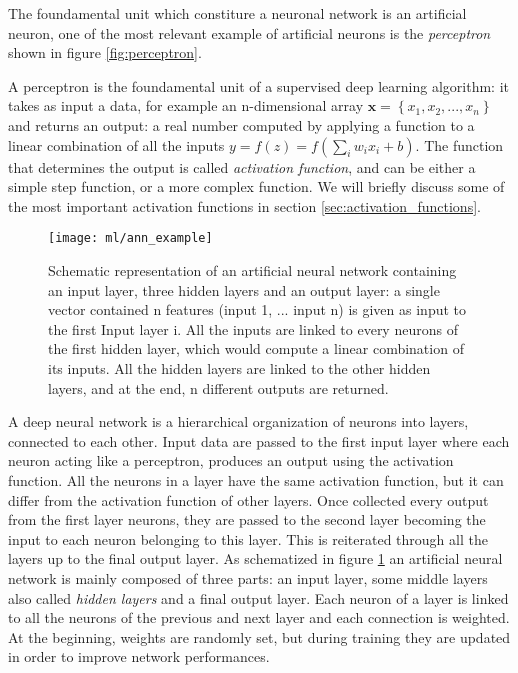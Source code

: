 \documentclass[11pt]{report}
\begin{document}
The foundamental unit which constiture a neuronal network is an artificial neuron, one of the most relevant example of artificial neurons is the \emph{perceptron} shown in figure \ref{fig:perceptron}.

A perceptron is the foundamental unit of a supervised deep learning algorithm: it takes as input a data, for example an n-dimensional array $\textbf{x} = \left\{ x_1, x_2, ..., x_n\right\}$ and returns an output: a real number computed by applying a function to a linear combination of all the inputs $ y = f(z) = f \left ( \sum_i w_{i} x_i + b \right )$.
The function that determines the output is called \emph{activation function}, and can be either a simple step function, or a more complex function.
We will briefly discuss some of the most important activation functions in section \ref{sec:activation_functions}.


\begin{figure}
\centering
\texttt{[image: ml/ann\_example]}
\caption{Schematic representation of an artificial neural network containing an input layer, three hidden layers and an output layer: a single vector contained n features (input 1, ... input n) is given as input to the first Input layer i. All the inputs are linked to every neurons of the first hidden layer, which would compute a linear combination of its inputs. All the hidden layers are linked to the other hidden layers, and at the end, n different outputs are returned.
}
\label{fig:ann}
\end{figure}


A deep neural network is a hierarchical organization of neurons into layers, connected to each other.
Input data are passed to the first input layer where each neuron acting like a perceptron, produces an output using the activation function.
All the neurons in a layer have the same activation function, but it can differ from the activation function of other layers.
Once collected every output from the first layer neurons, they are passed to the second layer becoming the input to each neuron belonging to this layer.
This is reiterated through all the layers up to the final output layer.
As schematized in figure \ref{fig:ann} an artificial neural network is mainly composed of three parts: an input layer, some middle layers also called \emph{hidden layers} and a final output layer.
Each neuron of a layer is linked to all the neurons of the previous and next layer and each connection is weighted.
At the beginning, weights are randomly set, but during training they are updated in order to improve network performances.
\end{document}
